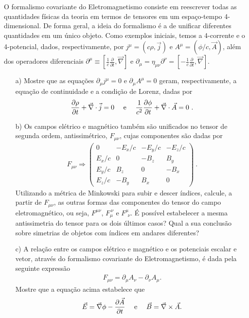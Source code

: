 \documentclass[a4paper,12pt]{article}
\begin{document}
\indent \par O formalismo covariante do Eletromagnetismo consiste em reescrever todas as quantidades físicas da teoria em termos de tensores em um espaço-tempo 4-dimensional. De forma geral, a ideia do formalismo é a de unificar diferentes quantidades em um único objeto. Como exemplos iniciais, temos a 4-corrente e o 4-potencial, dados, respectivamente, por $j^{\mu}=(c\rho, \vec{j})$ e $A^{\mu}=(\phi/c, \vec{A})$, além dos operadores diferenciais $\partial^{\mu}\equiv \left[\frac{1}{c}\frac{\partial}{\partial t},\vec{\nabla}\right]$ e $\partial_{\mu}=\eta_{\mu \nu}\partial^{\nu}=\left[-\frac{1}{c}\frac{\partial}{\partial t},\vec{\nabla}\right]$.
%
\begin{itemize}
 \item[a)] Mostre que as equações $\partial_{\mu}j^{\mu}=0$ e $\partial_{\mu}A^{\mu}=0$ geram, respectivamente, a equação de continuidade e a condição de Lorenz, dadas por 
 \begin{eqnarray}
  \nonumber
  \frac{\partial \rho}{\partial t}+ \vec{\nabla}\cdot\vec{j}=0  ~~~~\textnormal{e}~~~~  \frac{1}{c^2}\frac{\partial \phi}{\partial t}+ \vec{\nabla}\cdot\vec{A}=0 ~.
 \end{eqnarray}
 \item[b)] Os campos elétrico e magnético também são unificados no tensor de segunda ordem, antissimétrico, $F_{\mu \nu}$, cujas componentes são dadas por 
\begin{eqnarray}
  \nonumber
  F_{\mu \nu} \Rightarrow  
  \begin{pmatrix}
 0 & -E_{x}/c & -E_{y}/c & -E_{z}/c \\
 E_{x}/c & 0 & -B_{z} & B_{y} \\
 E_{y}/c & B_{z} & 0 & -B_{x} \\
 E_{z}/c & -B_{y} & B_{x} & 0  
\end{pmatrix}~.
%
 \end{eqnarray}
%
\noindent Utilizando a métrica de Minkowski para subir e descer índices, calcule, a partir de $F_{\mu\nu}$, as outras formas das componentes do tensor do campo eletromagnético, ou seja, $F^{\mu \nu}$, $F_{\mu}^{~\nu}$ e $F^{\mu}_{~~\nu}$. É possível estabelecer a mesma antissimetria do tensor para os dois últimos casos? Qual a sua conclusão sobre simetrias de objetos com índices em andares diferentes?
% 
\item[c)] A relação entre os campos elétrico e magnético e os potenciais escalar e vetor, através do formalismo covariante do Eletromagnetismo, é dada pela seguinte expressão  
%
 \begin{eqnarray}
  \nonumber
  F_{\mu \nu}=\partial_{\mu}A_{\nu} - \partial_{\nu}A_{\mu}. 
 \end{eqnarray}
% 
 \noindent Mostre que a equação acima estabelece que
%
 \begin{eqnarray}
  \nonumber
  \vec{E}=\vec{\nabla}\phi - \frac{\partial \vec{A}}{\partial t} ~~~~\textnormal{e}~~~~ \vec{B}=\vec{\nabla}\times \vec{A}. 
 \end{eqnarray}


\end{itemize}
\end{document}
